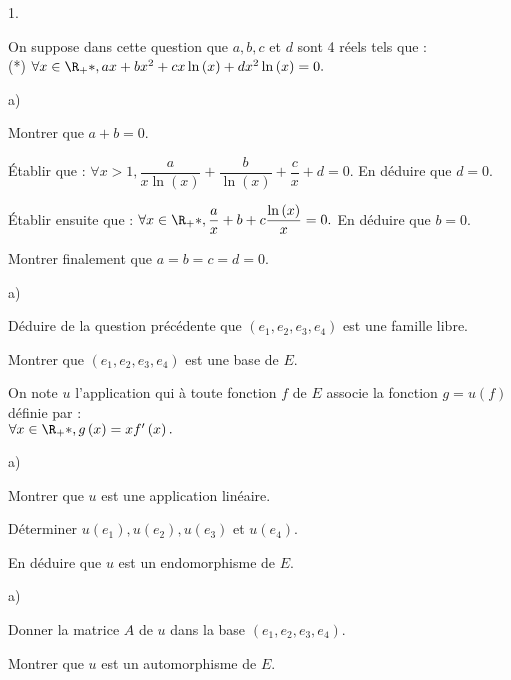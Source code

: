 \documentclass[11pt]{article}%
\begin{document}
\begin{noliste}{1.}
 \setlength{\itemsep}{4mm}
\item On suppose dans cette question que $a,b,c$ et $d$ sont 4 réels
tels que :\\
(*) $\forall x\in \R_{+}{\ast },ax + bx^{2} + cx\ln \left( x\right)
 + dx^{2}\ln \left( x\right) = 0.$

\begin{noliste}{a)}
 \setlength{\itemsep}{2mm}
\item Montrer que $a + b = 0.$

\item Établir que : $\forall x>1,\dfrac{a}{x\ln \left( x\right) } +
\dfrac{b}{\ln \left( x\right) } + \dfrac{c}{x} + d = 0.$ En déduire que
$d = 0.$

\item Établir ensuite que : $\forall x\in \R_{+}{\ast },\dfrac{a}{x} +
b + c\dfrac{\ln \left( x\right) }{x} = 0.$ En déduire que $b = 0.$

\item Montrer finalement que $a = b = c = d = 0.$
\end{noliste}

\item 
\begin{noliste}{a)}
 \setlength{\itemsep}{2mm}
\item Déduire de la question précédente que $\left(
e_{1},e_{2},e_{3},e_{4}\right) $ est une famille libre.

\item Montrer que $\left( e_{1},e_{2},e_{3},e_{4}\right) $ est une base
de $E.$
\end{noliste}

\item On note $u$ l'application qui à toute fonction $f$ de $E$ associe
la fonction $g = u\left( f\right) $ définie par :\\
$\forall x\in \R_{+}{\ast },g\left( x\right) = xf^{\prime }\left(
x\right).$

\begin{noliste}{a)}
 \setlength{\itemsep}{2mm}
\item Montrer que $u$ est une application linéaire.

\item Déterminer $u\left( e_{1}\right),u\left( e_{2}\right),u\left(
e_{3}\right) $ et $u\left( e_{4}\right).$

\item En déduire que $u$ est un endomorphisme de $E.$
\end{noliste}

\item 
\begin{noliste}{a)}
 \setlength{\itemsep}{2mm}
\item Donner la matrice $A$ de $u$ dans la base $\left(
e_{1},e_{2},e_{3},e_{4}\right).$

\item Montrer que $u$ est un automorphisme de $E.$
\end{noliste}
\end{noliste}
\end{document}
